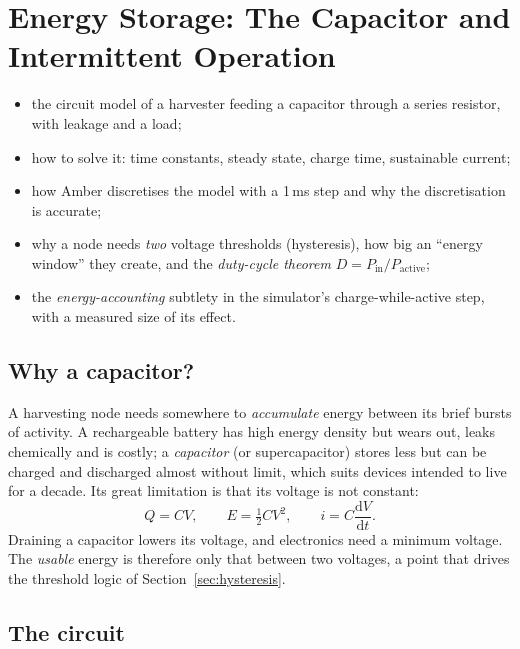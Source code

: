 \chapter{Energy Storage: The Capacitor and Intermittent Operation}
\label{ch:capacitor}

\begin{defbox}
\begin{itemize}
 \item the circuit model of a harvester feeding a capacitor through a series resistor, with leakage and a load;
 \item how to solve it: time constants, steady state, charge time, sustainable current;
 \item how Amber discretises the model with a 1\,ms step and why the discretisation is accurate;
 \item why a node needs \emph{two} voltage thresholds (hysteresis), how big an ``energy window'' they create, and the \emph{duty-cycle theorem} $D=P_{\mathrm{in}}/P_{\mathrm{active}}$;
 \item the \emph{energy-accounting} subtlety in the simulator's charge-while-active step, with a measured size of its effect.
\end{itemize}
\end{defbox}

\section{Why a capacitor?}

A harvesting node needs somewhere to \emph{accumulate} energy between its brief
bursts of activity. A rechargeable battery has high energy density but wears out,
leaks chemically and is costly; a \emph{capacitor} (or supercapacitor) stores less but
can be charged and discharged almost without limit, which suits devices intended to
live for a decade. Its great limitation is that its voltage is not constant:
\begin{equation}
 Q=CV,\qquad E=\tfrac12CV^{2},\qquad i=C\frac{\mathrm{d}V}{\mathrm{d}t}.
\label{eq:cap}
\end{equation}
Draining a capacitor lowers its voltage, and electronics need a minimum voltage.
The \emph{usable} energy is therefore only that between two voltages, a point
that drives the threshold logic of Section~\ref{sec:hysteresis}.

\section{The circuit}
\label{sec:circuit}

